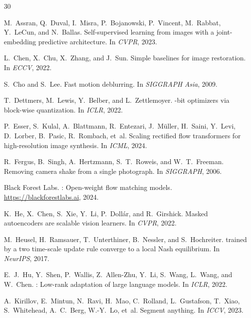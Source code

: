\documentclass{article}
\begin{document}
\begin{thebibliography}{30}

M.~Assran, Q.~Duval, I.~Misra, P.~Bojanowski, P.~Vincent, M.~Rabbat, Y.~LeCun, and N.~Ballas.
\newblock Self-supervised learning from images with a joint-embedding predictive architecture.
\newblock In \emph{CVPR}, 2023.

L.~Chen, X.~Chu, X.~Zhang, and J.~Sun.
\newblock Simple baselines for image restoration.
\newblock In \emph{ECCV}, 2022.

S.~Cho and S.~Lee.
\newblock Fast motion deblurring.
\newblock In \emph{SIGGRAPH Asia}, 2009.

T.~Dettmers, M.~Lewis, Y.~Belber, and L.~Zettlemoyer.
-bit optimizers via block-wise quantization.
\newblock In \emph{ICLR}, 2022.

P.~Esser, S.~Kulal, A.~Blattmann, R.~Entezari, J.~M{\"u}ller, H.~Saini, Y.~Levi, D.~Lorber, B.~Pasic, R.~Rombach, et~al.
\newblock Scaling rectified flow transformers for high-resolution image synthesis.
\newblock In \emph{ICML}, 2024.

R.~Fergus, B.~Singh, A.~Hertzmann, S.~T.~Roweis, and W.~T.~Freeman.
\newblock Removing camera shake from a single photograph.
\newblock In \emph{SIGGRAPH}, 2006.

Black Forest Labs.
: Open-weight flow matching models.
\newblock \url{https://blackforestlabs.ai}, 2024.

K.~He, X.~Chen, S.~Xie, Y.~Li, P.~Doll{\'a}r, and R.~Girshick.
\newblock Masked autoencoders are scalable vision learners.
\newblock In \emph{CVPR}, 2022.

M.~Heusel, H.~Ramsauer, T.~Unterthiner, B.~Nessler, and S.~Hochreiter.
 trained by a two time-scale update rule converge to a local {N}ash equilibrium.
\newblock In \emph{NeurIPS}, 2017.

E.~J.~Hu, Y.~Shen, P.~Wallis, Z.~Allen-Zhu, Y.~Li, S.~Wang, L.~Wang, and W.~Chen.
: Low-rank adaptation of large language models.
\newblock In \emph{ICLR}, 2022.

A.~Kirillov, E.~Mintun, N.~Ravi, H.~Mao, C.~Rolland, L.~Gustafson, T.~Xiao, S.~Whitehead, A.~C.~Berg, W.-Y.~Lo, et~al.
\newblock Segment anything.
\newblock In \emph{ICCV}, 2023.


\end{thebibliography}
\end{document}

